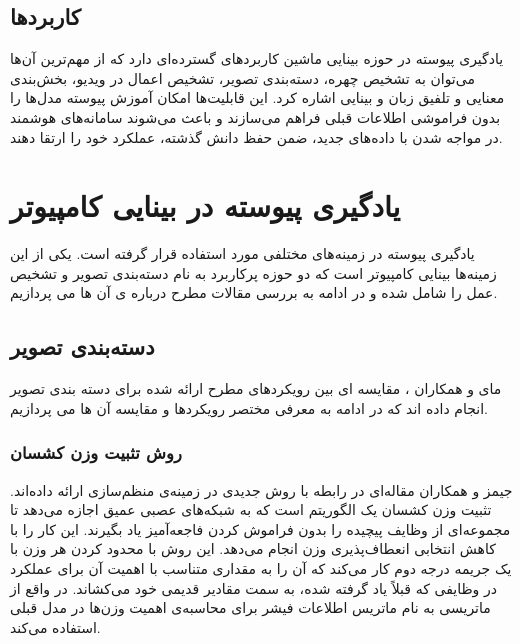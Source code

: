 \subsection{کاربردها}
یادگیری پیوسته در حوزه بینایی ماشین کاربردهای گسترده‌ای دارد که از مهم‌ترین آن‌ها می‌توان به تشخیص چهره، دسته‌بندی تصویر، تشخیص اعمال در ویدیو، بخش‌بندی معنایی و تلفیق زبان و بینایی اشاره کرد. این قابلیت‌ها امکان آموزش پیوسته مدل‌ها را بدون فراموشی اطلاعات قبلی فراهم می‌سازند و باعث می‌شوند سامانه‌های هوشمند در مواجه شدن با داده‌های جدید، ضمن حفظ دانش گذشته، عملکرد خود را ارتقا دهند.

\section{یادگیری پیوسته در بینایی کامپیوتر}
یادگیری پیوسته در زمینه‌های مختلفی مورد استفاده قرار گرفته است. یکی از این زمینه‌ها بینایی کامپیوتر است که دو حوزه پرکاربرد به نام دسته‌بندی تصویر و تشخیص عمل را شامل شده و در ادامه به بررسی مقالات مطرح درباره ی آن ها می پردازیم. 
\subsection{دسته‌بندی تصویر}
مای و همکاران 
\cite{2}
، مقایسه ای بین رویکردهای مطرح ارائه شده برای دسته بندی تصویر انجام داده اند که در ادامه به معرفی مختصر رویکردها و مقایسه آن ها می پردازیم.
\subsubsection{روش تثبیت وزن کشسان}
جیمز و همکاران
\cite{7}
مقاله‌ای در رابطه با روش جدیدی در زمینه‌ی منظم‌سازی ارائه داده‌اند. تثبیت وزن کشسان
یک الگوریتم است که به شبکه‌های عصبی عمیق اجازه می‌دهد تا مجموعه‌ای از وظایف پیچیده را بدون فراموش کردن فاجعه‌آمیز یاد بگیرند. این کار را با کاهش انتخابی انعطاف‌پذیری وزن انجام می‌دهد. این روش با محدود کردن هر وزن با یک جریمه درجه دوم کار می‌کند که آن را به مقداری متناسب با اهمیت آن برای عملکرد در وظایفی که قبلاً یاد گرفته شده، به سمت مقادیر قدیمی خود می‌کشاند. در واقع از ماتریسی به نام ماتریس اطلاعات فیشر برای محاسبه‌ی اهمیت وزن‌ها در مدل قبلی استفاده می‌کند.


